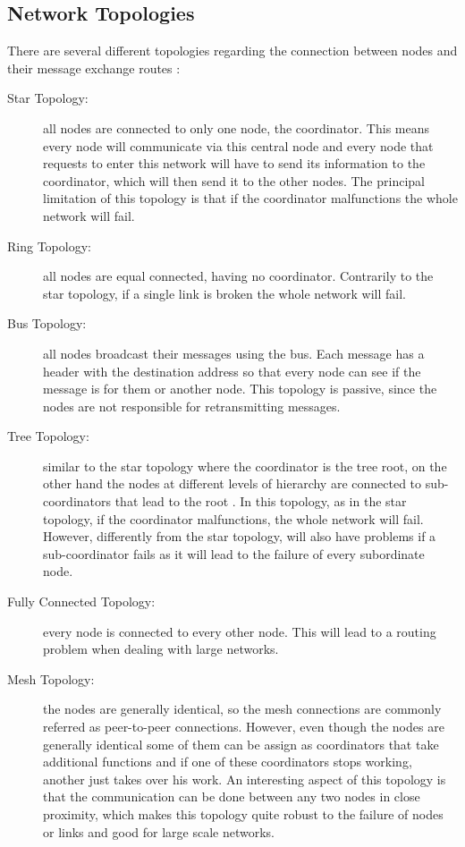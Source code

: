 \subsection{Network Topologies}
There are several different topologies regarding the connection between nodes and their message
exchange routes \cite{Yadav2012, Lewis2004}:
\begin{description}
    \item[Star Topology:] all nodes are connected to only one node, the coordinator. This
        means every node will communicate via this central node and every node that requests
        to enter this network will have to send its information to the coordinator, which
        will then send it to the other nodes. The principal limitation of this topology is
        that if the coordinator malfunctions the whole network will fail.
    \item[Ring Topology:] all nodes are equal connected, having no coordinator. Contrarily
        to the star topology, if a single link is broken the whole network will fail.
    \item[Bus Topology:] all nodes broadcast their messages using the bus. Each message
        has a header with the destination address so that every node can see if the message
        is for them or another node. This topology is passive, since the nodes are not
        responsible for retransmitting messages.
    \item[Tree Topology:] similar to the star topology where the coordinator is the tree root, on
        the other hand the nodes at different levels of hierarchy are connected to sub-coordinators
        that lead to the root \cite{Shrestha2007}. In this topology, as in the star topology, if
        the coordinator malfunctions, the whole network will fail. However, differently from
        the star topology, will also have problems if a sub-coordinator fails as it will lead
        to the failure of every subordinate node.
    \item[Fully Connected Topology:] every node is connected to every other node. This will
        lead to a routing problem when dealing with large networks.
    \item[Mesh Topology:] the nodes are generally identical, so the mesh connections are
        commonly referred as peer-to-peer connections. However, even though the nodes are
        generally identical some of them can be assign as coordinators that take additional
        functions and if one of these coordinators stops working, another just takes over his
        work. An interesting aspect of this topology is that the communication can be
        done between any two nodes in close proximity, which makes this topology quite
        robust to the failure of nodes or links and good for large scale networks.
\end{description}

